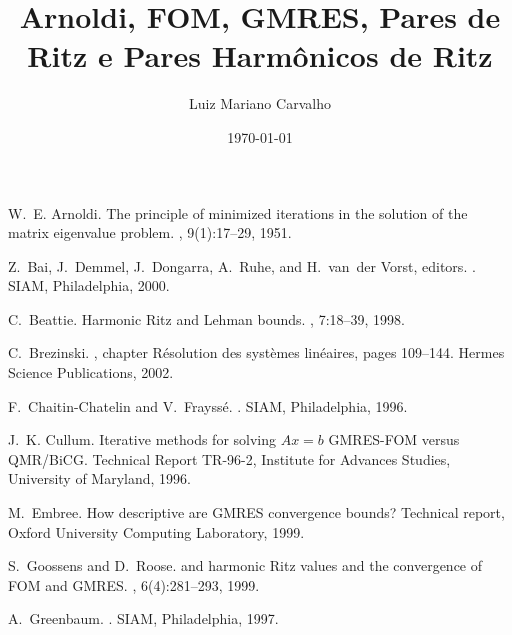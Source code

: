\documentclass{report}
\title{Arnoldi, FOM, GMRES, Pares de Ritz e Pares Harmônicos de Ritz}
\author{ Luiz Mariano  Carvalho }
\date{\today
}
\begin{document}
	
\maketitle









\begin{thebibliography}{100}
	
     W.~E. Arnoldi. \newblock The principle of minimized iterations in the solution of the
    matrix
  eigenvalue problem.
, 9(1):17--29, 1951.


	 Z.~Bai, J.~Demmel, J.~Dongarra, A.~Ruhe, and H.~van~der Vorst, editors.
	.
	\newblock SIAM, Philadelphia, 2000.


	 C.~Beattie. \newblock Harmonic {R}itz and {L}ehman bounds. ,
	7:18--39, 1998.

	 C.~Brezinski. ,
    chapter
  Résolution des systèmes linéaires, pages 109--144.
\newblock Hermes Science Publications, 2002.

 F.~{Chaitin-Chatelin} and V.~Frayssé. . \newblock SIAM, Philadelphia, 1996.



	 J.~K. Cullum. \newblock Iterative methods for solving ${A}x=b$ {GMRES-FOM} versus
	{QMR/BiCG}. \newblock Technical Report TR-96-2, Institute for Advances Studies, University
	of Maryland, 1996.
	
	 M.~Embree. \newblock How descriptive are {GMRES} convergence bounds? \newblock Technical
report, Oxford University Computing Laboratory, 1999.

	 S.~Goossens and D.~Roose.  and harmonic {Ritz} values and the
	convergence of {FOM} and
	{GMRES}.
	, 6(4):281--293,
	1999.
	
	 A.~Greenbaum. .
    \newblock SIAM, Philadelphia, 1997.
	

\end{thebibliography}
\end{document}
